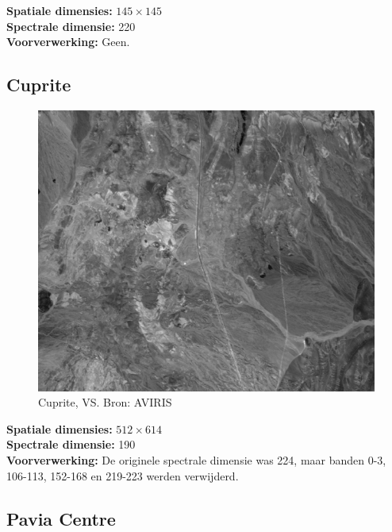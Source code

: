 \textbf{Spatiale dimensies:} $145 \times 145$\\
\textbf{Spectrale dimensie:} 220\\
\textbf{Voorverwerking:} Geen.

\newpage
\subsection{Cuprite}

\begin{figure}[H]
  \centering
  \includegraphics[scale=0.5]{images/cuprite_sum.png}
  \caption{Cuprite, VS. Bron: AVIRIS \cite{ref:ehu_aviris_cuprite}}
  \label{fig:cuprite_sum}
\end{figure}

\textbf{Spatiale dimensies:} $512 \times 614$\\
\textbf{Spectrale dimensie:} 190\\
\textbf{Voorverwerking:} De originele spectrale dimensie was 224, maar banden 0-3, 106-113, 152-168 en 219-223 werden verwijderd.

\newpage
\subsection{Pavia Centre}

